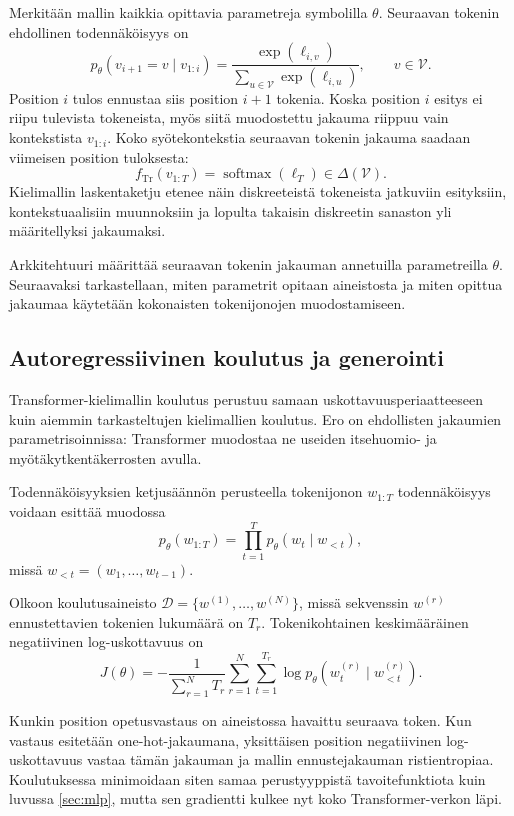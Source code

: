 Merkitään mallin kaikkia opittavia parametreja symbolilla
\(\theta\). Seuraavan tokenin ehdollinen todennäköisyys on
$$
p_{\theta}(v_{i+1}=v \mid v_{1:i})
=
\frac{\exp(\ell_{i,v})}
{\displaystyle\sum_{u \in \mathcal{V}}\exp(\ell_{i,u})},
\qquad
v \in \mathcal{V}.
$$
Position \(i\) tulos ennustaa siis position \(i+1\) tokenia.
Koska position \(i\) esitys ei riipu tulevista tokeneista,
myös siitä muodostettu jakauma riippuu vain kontekstista
\(v_{1:i}\). Koko syötekontekstia seuraavan tokenin jakauma
saadaan viimeisen position tuloksesta:
$$
f_{\mathrm{Tr}}(v_{1:T})
=
\operatorname{softmax}(\ell_T)
\in
\Delta(\mathcal{V}).
$$
Kielimallin laskentaketju etenee näin diskreeteistä tokeneista
jatkuviin esityksiin, kontekstuaalisiin muunnoksiin ja lopulta
takaisin diskreetin sanaston yli määritellyksi jakaumaksi.

Arkkitehtuuri määrittää seuraavan tokenin jakauman annetuilla
parametreilla \(\theta\). Seuraavaksi tarkastellaan, miten
parametrit opitaan aineistosta ja miten opittua jakaumaa
käytetään kokonaisten tokenijonojen muodostamiseen.

\subsection{Autoregressiivinen koulutus ja generointi}

Transformer-kielimallin koulutus perustuu samaan
uskottavuusperiaatteeseen kuin aiemmin tarkasteltujen
kielimallien koulutus. Ero on ehdollisten jakaumien
parametrisoinnissa: Transformer muodostaa ne useiden
itsehuomio- ja myötäkytkentäkerrosten avulla.

Todennäköisyyksien ketjusäännön perusteella tokenijonon
\(w_{1:T}\) todennäköisyys voidaan esittää muodossa
$$
p_{\theta}(w_{1:T})
=
\prod_{t=1}^{T}
p_{\theta}(w_t \mid w_{<t}),
$$
missä \(w_{<t}=(w_1,\dots,w_{t-1})\).

Olkoon koulutusaineisto
\(\mathcal{D}=\{w^{(1)},\dots,w^{(N)}\}\), missä sekvenssin
\(w^{(r)}\) ennustettavien tokenien lukumäärä on \(T_r\).
Tokenikohtainen keskimääräinen negatiivinen log-uskottavuus on
$$
J(\theta)
=
-\frac{1}{\displaystyle\sum_{r=1}^{N}T_r}
\sum_{r=1}^{N}
\sum_{t=1}^{T_r}
\log p_{\theta}
\left(
  w_t^{(r)}
  \mid
  w_{<t}^{(r)}
\right).
$$

Kunkin position opetusvastaus on aineistossa havaittu seuraava
token. Kun vastaus esitetään one-hot-jakaumana, yksittäisen
position negatiivinen log-uskottavuus vastaa tämän jakauman
ja mallin ennustejakauman ristientropiaa. Koulutuksessa
minimoidaan siten samaa perustyyppistä tavoitefunktiota kuin
luvussa \ref{sec:mlp}, mutta sen gradientti kulkee nyt koko
Transformer-verkon läpi.

